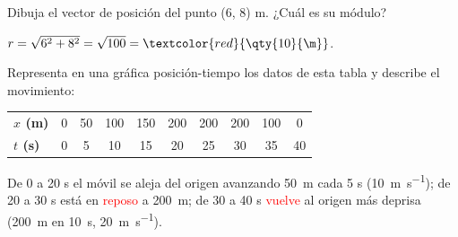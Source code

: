 \begin{exercise}
    Dibuja el vector de posición del punto (6, 8) m. ¿Cuál es su módulo?
    \begin{solu}
        \(r = \sqrt{6^2 + 8^2} = \sqrt{100} = \textcolor{red}{\qty{10}{\m}}\).
    \end{solu}
\end{exercise}

\begin{exercise}
    Representa en una gráfica posición-tiempo los datos de esta tabla y describe el movimiento:
    \begin{center}
        \begin{tabular}{@{}lccccccccc@{}}
            \toprule
            \textbf{\(x\) (\unit{\m})} & 0 & 50 & 100 & 150 & 200 & 200 & 200 & 100 & 0 \\[3pt]
            \textbf{\(t\) (\unit{\s})} & 0 & 5 & 10 & 15 & 20 & 25 & 30 & 35 & 40 \\
            \bottomrule
        \end{tabular}
    \end{center}
    \begin{solu}
        \begin{center}
        \end{center}
        De 0 a 20 s el móvil se aleja del origen avanzando \qty{50}{\m} cada 5 s (\qty{10}{\m\per\s}); de 20 a 30 s está en \textcolor{red}{reposo} a \qty{200}{\m}; de 30 a 40 s \textcolor{red}{vuelve} al origen más deprisa (\qty{200}{\m} en \qty{10}{\s}, \qty{20}{\m\per\s}).
    \end{solu}
\end{exercise}

